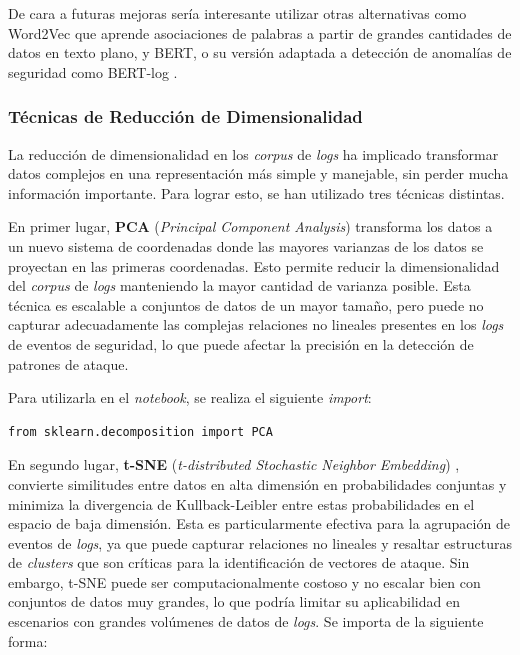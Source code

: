 De cara a futuras mejoras sería interesante utilizar otras alternativas como Word2Vec que aprende asociaciones de palabras a partir de grandes cantidades de datos en texto plano, y \gls{BERT}, o su versión adaptada a detección de anomalías de seguridad como \gls{BERT}-log \cite{guo2021logbert}.

\vspace{-2mm}

\subsubsection*{Técnicas de Reducción de Dimensionalidad}

La reducción de dimensionalidad en los \textit{corpus} de \textit{logs} ha implicado transformar datos complejos en una representación más simple y manejable, sin perder mucha información importante. Para lograr esto, se han utilizado tres técnicas distintas.

En primer lugar, \textbf{\gls{PCA}} (\textit{Principal Component Analysis}) \cite{Jolliffe2016PCA} transforma los datos a un nuevo sistema de coordenadas donde las mayores varianzas de los datos se proyectan en las primeras coordenadas. Esto permite reducir la dimensionalidad del \textit{corpus} de \textit{logs} manteniendo la mayor cantidad de varianza posible. Esta técnica es escalable a conjuntos de datos de un mayor tamaño, pero puede no capturar adecuadamente las complejas relaciones no lineales presentes en los \textit{logs} de eventos de seguridad, lo que puede afectar la precisión en la detección de patrones de ataque. 

Para utilizarla en el \textit{notebook}, se realiza el siguiente \textit{import}:

\begin{center}
    \begin{mdframed}
    \scriptsize
            \begin{verbatim}
from sklearn.decomposition import PCA
            \end{verbatim}
    \end{mdframed}
\end{center}

En segundo lugar, \textbf{\gls{t-SNE}} (\textit{t-distributed Stochastic Neighbor Embedding}) \cite{Maaten2008tSNE}, convierte similitudes entre datos en alta dimensión en probabilidades conjuntas y minimiza la divergencia de Kullback-Leibler entre estas probabilidades en el espacio de baja dimensión. Esta es particularmente efectiva para la agrupación de eventos de \textit{logs}, ya que puede capturar relaciones no lineales y resaltar estructuras de \textit{clusters} que son críticas para la identificación de vectores de ataque. Sin embargo, \gls{t-SNE} puede ser computacionalmente costoso y no escalar bien con conjuntos de datos muy grandes, lo que podría limitar su aplicabilidad en escenarios con grandes volúmenes de datos de \textit{logs}. Se importa de la siguiente forma:

